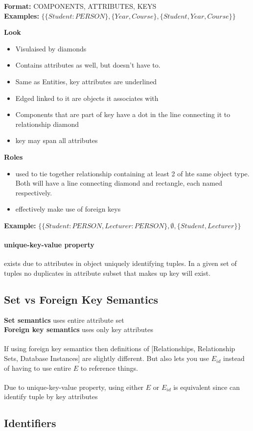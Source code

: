 \documentclass{article}
\newcommand\tab[1][0.5cm]{\hspace*{#1}}
\begin{document}
			\tab \textbf{Format:} {COMPONENTS, ATTRIBUTES, KEYS}
			\\ \tab \tab \textbf{Examples:} $\{\{Student:PERSON\},\{Year, Course\}, \{Student, Year, Course\}\}$

			\textbf{Look}
			\begin{itemize}
				\item Visulaised by diamonds
				\item Contains attributes as well, but doesn't have to.
				\item Same as Entities, key attributes are underlined
				\item Edged linked to it are objects it associates with
				\item Components that are part of key have a dot in the line connecting it to relationship diamond
				\item key may span all attributes
			\end{itemize}

			\textbf{Roles}
			\begin{itemize}
				\item used to tie together relationship containing at least 2 of hte same object type. Both will have a line connecting diamond and rectangle, each named respectively.
				\item effectively make use of foreign keys
			\end{itemize}
			\tab \textbf{Example:} $\{\{Student:PERSON, Lecturer:PERSON\},\emptyset, \{Student, Lecturer\}\}$

		\paragraph{unique-key-value property} exists due to attributes in object uniquely identifying tuples. In a given set of tuples no duplicates in attribute subset that makes up key will exist.

	\subsection{Set vs Foreign Key Semantics}
		\textbf{Set semantics} uses entire attribute set\\
		\textbf{Foreign key semantics} uses only key attributes
		\\\\If using foreign key semantics then definitions of [Relationships, Relationship Sets, Database Instances] are slightly different. But also lets you use $E_{id}$ instead of having to use entire $E$ to reference things.
		\\\\Due to unique-key-value property, using either $E$ or $E_{id}$ is equivalent since can identify tuple by key attributes

	\subsection{Identifiers}
\end{document}
